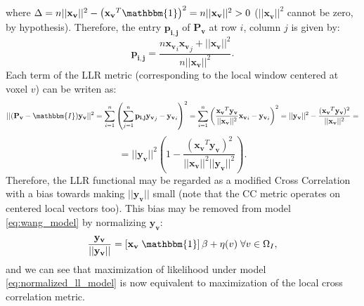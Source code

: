 where $\Delta = n||\mathbf{x_{v}}||^{2} - \left(\mathbf{x_{v}}^{T}\mathbbm{1}\right)^{2} = n||\mathbf{x_{v}}||^{2} > 0$ ($||\mathbf{x_{v}}||^{2}$ cannot be zero, by hypothesis). Therefore, the entry $\mathbf{p_{i,j}}$ of $\mathbf{P_v}$ at row $i$, column $j$ is given by:
\begin{equation}
    \mathbf{p_{i,j}} = \frac{n\mathbf{x_{v}}_{i}\mathbf{x_{v}}_{j} + ||\mathbf{x_v}||^{2}}{n||\mathbf{x_{v}}||^{2}}.
\end{equation}
Each term of the LLR metric (corresponding to the local window centered at voxel $v$) can be writen as:
\begin{displaymath}
    ||(\mathbf{P_{v}} - \mathbbm{I})\mathbf{y_{v}}||^{2} = \sum_{i=1}^{n} \left(\sum_{j=1}^{n} \mathbf{p_{i,j}} \mathbf{y_{v}}_{j} - \mathbf{y_{v}}_{i}\right)^{2} =
    \sum_{i=1}^{n}\left(\frac{\mathbf{x_{v}}^{T}\mathbf{y_{v}}}{||\mathbf{x_{v}}||^{2}} \mathbf{x_{v}}_{i} - \mathbf{y_{v}}_{i}\right)^{2} = ||\mathbf{y_{v}}||^{2} - \frac{(\mathbf{x_{v}}^{T}\mathbf{y_{v}})^{2}}{||\mathbf{x_{v}}||^{2}} =
\end{displaymath}
\begin{equation}\label{eq:llr_cc_relationship}
    = ||\mathbf{y_{v}}||^{2}\left(1 - \frac{(\mathbf{x_{v}}^{T}\mathbf{y_{v}})^{2}}{||\mathbf{x_{v}}||^{2}||\mathbf{y_{v}}||^{2}}\right).
\end{equation}
Therefore, the LLR functional may be regarded as a modified Cross Correlation with a bias towards making $||\mathbf{y_{v}}||$ small (note that the CC metric operates on centered local vectors too). This bias may be removed from model \eqref{eq:wang_model} by normalizing $\mathbf{y_{v}}$:\\
\begin{equation}\label{eq:normalized_ll_model}
    \frac{\mathbf{y_{v}}}{||\mathbf{y_{v}}||} = \left[\mathbf{x_{v}} \; \mathbbm{1}\right]\beta + \eta(v) \; \forall v\in\Omega_{I},
\end{equation}
and we can see that maximization of likelihood under model \eqref{eq:normalized_ll_model} is now equivalent to maximization of the local cross correlation metric.\\


